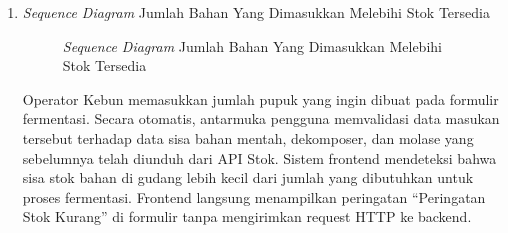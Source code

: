 \documentclass[a4paper,11pt]{article}
\begin{document}
\begin{enumerate}
    \textbf{Penjelasan Alur:}
    \begin{itemize}
        \item \textbf{Aksi Awal:} Operator mengisi formulir fermentasi dengan data kosong atau tidak lengkap dan menekan \textbf{Simpan}.
        \item \textbf{Alur Backend:} Request dikirim ke handler. Handler mendeteksi kegagalan validasi schema (kolom wajib kosong/invalid).
        \item \textbf{Akses Data:} Tidak ada interaksi dengan layer usecase atau database karena request langsung ditolak di layer handler.
        \item \textbf{Output:} Handler mengembalikan respons \texttt{HTTP 400 Bad Request}. Antarmuka menampilkan pesan kesalahan ``Pencatatan gagal, periksa kembali data yang dimasukkan''.
    \end{itemize}

    \item \textit{Sequence Diagram} Jumlah Bahan Yang Dimasukkan Melebihi Stok Tersedia
    \begin{figure}[H]
        \centering
        \caption{\textit{Sequence Diagram} Jumlah Bahan Yang Dimasukkan Melebihi Stok Tersedia}
        \label{fig:sd-fermentasi-stok-kurang}
    \end{figure}

    \hspace{1em} Operator Kebun memasukkan jumlah pupuk yang ingin dibuat pada formulir fermentasi. Secara otomatis, antarmuka pengguna memvalidasi data masukan tersebut terhadap data sisa bahan mentah, dekomposer, dan molase yang sebelumnya telah diunduh dari API Stok. Sistem frontend mendeteksi bahwa sisa stok bahan di gudang lebih kecil dari jumlah yang dibutuhkan untuk proses fermentasi. Frontend langsung menampilkan peringatan ``Peringatan Stok Kurang'' di formulir tanpa mengirimkan request HTTP ke backend.


\end{enumerate}
\end{document}
